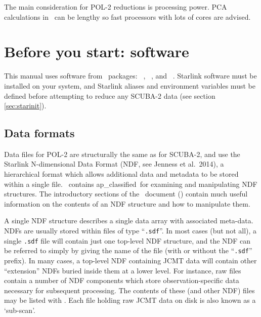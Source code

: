 The main consideration for POL-2 reductions is processing power. PCA calculations in
\makemap\ can be lengthy so fast processors with lots of cores are advised.


\section{Before you start: software}

This manual uses software from \starlink\ packages: \smurf\
\cite{smurf}, \Kappa\ \cite{kappa}, \polpack \cite{polpack} and \gaia\ \cite{gaia}.
Starlink software must be installed on your system, and Starlink
aliases and environment variables must be defined before attempting
to reduce any SCUBA-2 data (see section \ref{sec:starinit}).

\subsection{Data formats}
\label{sec:ndf}

Data files for POL-2 are structurally the same as for SCUBA-2, and use
the Starlink N-dimensional Data Format (NDF,
see Jenness et al.\ 2014\cite{ndf}), a hierarchical format which allows
additional data and metadata to be stored within a single file. \Kappa\
contains  {ap_classified}\ for examining and
manipulating NDF structures. The introductory sections of the \Kappa\
document () contain much useful information on
the contents of an NDF structure and how to manipulate them.

A single NDF structure describes a single data array with associated
meta-data. NDFs are usually stored within files of type ``\verb+.sdf+''.
In most cases (but not all), a single \verb+.sdf+ file will contain just
one top-level NDF structure, and the NDF can be referred to simply by
giving the name of the file (with or without the ``\verb+.sdf+'' prefix).
In many cases, a top-level NDF containing JCMT data will contain other
``extension'' NDFs buried inside them at a lower level. For instance, raw
files contain a number of NDF components which store observation-specific
data necessary for subsequent processing. The contents of these (and
other NDF) files may be listed with \HDSTRACEref. Each file holding raw
JCMT data on disk is also known as a `sub-scan'.

